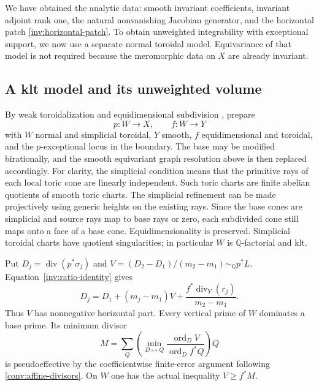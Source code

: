 We have obtained the analytic data: smooth invariant coefficients,
invariant adjoint rank one, the natural nonvanishing Jacobian generator,
and the horizontal patch \eqref{inv:horizontal-patch}.  To obtain
unweighted integrability with exceptional support, we now use a
separate normal toroidal model.  Equivariance of that model is not
required because the meromorphic data on $X$ are already invariant.

\subsection{A klt model and its unweighted volume}
\label{inv:toroidal-volume}

By weak toroidalization and equidimensional subdivision
\cite{ADK2013,AK2000}, prepare
\[
 p:W\to X,\qquad f:W\to Y
\]
with $W$ normal and simplicial toroidal, $Y$ smooth, $f$
equidimensional and toroidal, and the $p$-exceptional locus in the
boundary.  The base may be modified birationally, and the smooth
equivariant graph resolution above is then replaced accordingly.
For clarity, the simplicial condition means that the primitive rays of each local
toric cone are linearly independent.  Such toric charts are finite
abelian quotients of smooth toric charts.  The simplicial refinement
can be made projectively using
generic heights on the existing rays.  Since the base cones are
simplicial and source rays map to base rays or zero, each subdivided
cone still maps onto a face of a base cone.  Equidimensionality is
preserved.  Simplicial toroidal charts have quotient singularities;
in particular $W$ is $\mathbb Q$-factorial and klt.

Put $D_j=\operatorname{div}(p^*\sigma_j)$ and
$V=(D_2-D_1)/(m_2-m_1)\sim_{\mathbb Q}p^*L$.
Equation~\eqref{inv:ratio-identity} gives
\[
 D_j=D_1+(m_j-m_1)V+
            \frac{f^*\operatorname{div}_Y(r_j)}{m_2-m_1}.
\]
Thus $V$ has nonnegative horizontal part.  Every vertical prime of $W$
dominates a base prime.  Its minimum divisor
\[
 M=\sum_Q\left(\min_{D\mapsto Q}
             \frac{\operatorname{ord}_D V}{\operatorname{ord}_D f^*Q}
        \right)Q
\]
is pseudoeffective by the coefficientwise finite-error argument
following \eqref{conv:affine-divisors}.  On $W$ one has the actual inequality
$V\ge f^*M$.

